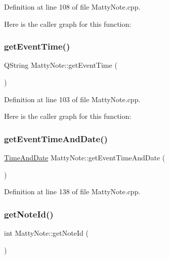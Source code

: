 Definition at line 108 of file Matty\+Note.\+cpp.

Here is the caller graph for this function\+:
\hypertarget{classMattyNote_a8c7f06ff44ce23f5a9ce6d2364732a24}{}\label{classMattyNote_a8c7f06ff44ce23f5a9ce6d2364732a24} 
\subsubsection{\texorpdfstring{get\+Event\+Time()}{getEventTime()}}
{\footnotesize\ttfamily Q\+String Matty\+Note\+::get\+Event\+Time (\begin{DoxyParamCaption}{ }\end{DoxyParamCaption})}



Definition at line 103 of file Matty\+Note.\+cpp.

Here is the caller graph for this function\+:
\hypertarget{classMattyNote_ac2579a4c26f27c8d86b6a57c81f5dc3b}{}\label{classMattyNote_ac2579a4c26f27c8d86b6a57c81f5dc3b} 
\subsubsection{\texorpdfstring{get\+Event\+Time\+And\+Date()}{getEventTimeAndDate()}}
{\footnotesize\ttfamily \hyperlink{structTimeAndDate}{Time\+And\+Date} Matty\+Note\+::get\+Event\+Time\+And\+Date (\begin{DoxyParamCaption}{ }\end{DoxyParamCaption})}



Definition at line 138 of file Matty\+Note.\+cpp.

\hypertarget{classMattyNote_ad7c5837f61e4813005ae063c67b9a0f0}{}\label{classMattyNote_ad7c5837f61e4813005ae063c67b9a0f0} 
\subsubsection{\texorpdfstring{get\+Note\+Id()}{getNoteId()}}
{\footnotesize\ttfamily int Matty\+Note\+::get\+Note\+Id (\begin{DoxyParamCaption}{ }\end{DoxyParamCaption})}



